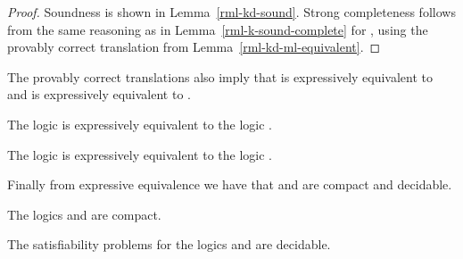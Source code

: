 \begin{proof}
Soundness is shown in Lemma~\ref{rml-kd-sound}.
Strong completeness follows from the same reasoning as in Lemma~\ref{rml-k-sound-complete} for \axiomRmlK{}, using the provably correct translation from Lemma~\ref{rml-kd-ml-equivalent}.
\end{proof}

The provably correct translations also imply that \logicRmlKFF{} is expressively equivalent to \logicKFF{} and \logicRmlKD{} is expressively equivalent to \logicKD{}.

\begin{corollary}
The logic \logicRmlKFF{} is expressively equivalent to the logic \logicKFF{}.
\end{corollary}

\begin{corollary}
The logic \logicRmlKD{} is expressively equivalent to the logic \logicKD{}.
\end{corollary}

Finally from expressive equivalence we have that \logicRmlKFF{} and \logicRmlKD{} are compact and decidable.

\begin{corollary}
The logics \logicRmlKFF{} and \logicRmlKD{} are compact.
\end{corollary}

\begin{corollary}
The satisfiability problems for the logics \logicRmlKFF{} and \logicRmlKD{} are decidable.
\end{corollary}
